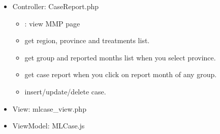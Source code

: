 \documentclass[letterpaper,10pt,english,openany,oneside]{sphinxmanual}
\begin{document}
\begin{itemize}
\item {} 
\sphinxAtStartPar
Controller: CaseReport.php
\begin{itemize}
\item {} 
\sphinxAtStartPar
{} : view MMP page

\item {} 
\sphinxAtStartPar
{} get region, province and treatments list.

\item {} 
\sphinxAtStartPar
{} get group and reported months list when you select province.

\item {} 
\sphinxAtStartPar
{} get case report when you click on report month of any group.

\item {} 
\sphinxAtStartPar
{} insert/update/delete case.

\end{itemize}

\begin{sphinxVerbatim}[commandchars=\\\{\}]
     
   
      
   
 
\end{sphinxVerbatim}

\item {} 
\sphinxAtStartPar
View: mlcase\_view.php

\item {} 
\sphinxAtStartPar
ViewModel: MLCase.js

\end{itemize}

\begin{sphinxVerbatim}[commandchars=\\\{\}]
  
  
    
    
  
  
     
     
\end{sphinxVerbatim}
\end{document}
